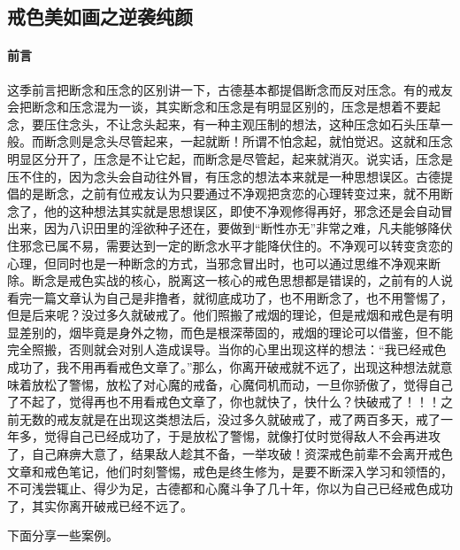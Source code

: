 \subsection{戒色美如画之逆袭纯颜}

\paragraph*{前言}

这季前言把断念和压念的区别讲一下，古德基本都提倡断念而反对压念。有的戒友会把断念和压念混为一谈，其实断念和压念是有明显区别的，压念是想着不要起念，要压住念头，不让念头起来，有一种主观压制的想法，这种压念如石头压草一般。而断念则是念头尽管起来，一起就断！所谓不怕念起，就怕觉迟。这就和压念明显区分开了，压念是不让它起，而断念是尽管起，起来就消灭。说实话，压念是压不住的，因为念头会自动往外冒，有压念的想法本来就是一种思想误区。古德提倡的是断念，之前有位戒友认为只要通过不净观把贪恋的心理转变过来，就不用断念了，他的这种想法其实就是思想误区，即使不净观修得再好，邪念还是会自动冒出来，因为八识田里的淫欲种子还在，要做到“断性亦无”非常之难，凡夫能够降伏住邪念已属不易，需要达到一定的断念水平才能降伏住的。不净观可以转变贪恋的心理，但同时也是一种断念的方式，当邪念冒出时，也可以通过思维不净观来断除。断念是戒色实战的核心，脱离这一核心的戒色思想都是错误的，之前有的人说看完一篇文章认为自己是非撸者，就彻底成功了，也不用断念了，也不用警惕了，但是后来呢？没过多久就破戒了。他们照搬了戒烟的理论，但是戒烟和戒色是有明显差别的，烟毕竟是身外之物，而色是根深蒂固的，戒烟的理论可以借鉴，但不能完全照搬，否则就会对别人造成误导。当你的心里出现这样的想法：“我已经戒色成功了，我不用再看戒色文章了。”那么，你离开破戒就不远了，出现这种想法就意味着放松了警惕，放松了对心魔的戒备，心魔伺机而动，一旦你骄傲了，觉得自己了不起了，觉得再也不用看戒色文章了，你也就快了，快什么？快破戒了！！！之前无数的戒友就是在出现这类想法后，没过多久就破戒了，戒了两百多天，戒了一年多，觉得自己已经成功了，于是放松了警惕，就像打仗时觉得敌人不会再进攻了，自己麻痹大意了，结果敌人趁其不备，一举攻破！资深戒色前辈不会离开戒色文章和戒色笔记，他们时刻警惕，戒色是终生修为，是要不断深入学习和领悟的，不可浅尝辄止、得少为足，古德都和心魔斗争了几十年，你以为自己已经戒色成功了，其实你离开破戒已经不远了。

下面分享一些案例。

